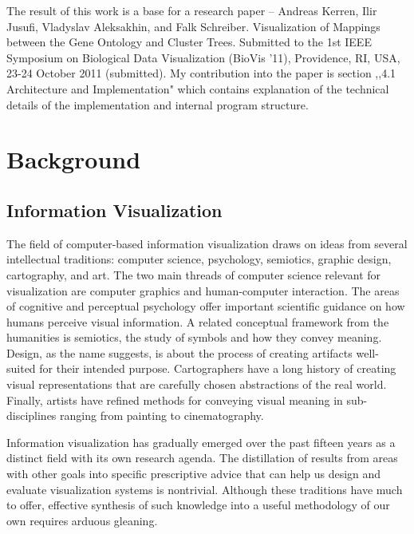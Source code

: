 The result of this work is a base for a research paper -- \textsf{Andreas Kerren, Ilir Jusufi, Vladyslav Aleksakhin, and Falk Schreiber. Visualization of Mappings between the Gene Ontology and Cluster Trees. Submitted to the 1st IEEE Symposium on Biological Data Visualization (BioVis '11), Providence, RI, USA, 23-24 October 2011 (submitted).} My contribution into the paper is section ,,4.1 Architecture and Implementation" which contains explanation of the technical details of the implementation and internal program structure.

\section{Background}
\label{sec:background}


\subsection{Information Visualization}
\label{sec:infovis}

The field of computer-based information visualization draws on ideas from several intellectual traditions: computer science, psychology, semiotics, graphic design, cartography, and art. The two main threads of computer science relevant for visualization are computer graphics and human-computer interaction. The areas of cognitive and perceptual psychology offer important scientific guidance on how humans perceive visual information. A related conceptual framework from the humanities is semiotics, the study of symbols and how they convey meaning. Design, as the name suggests, is about the process of creating artifacts well- suited for their intended purpose. Cartographers have a long history of creating visual representations that are carefully chosen abstractions of the real world. Finally, artists have refined methods for conveying visual meaning in sub-disciplines ranging from painting to cinematography.

Information visualization has gradually emerged over the past fifteen years as a distinct field with its own research agenda. The distillation of results from areas with other goals into specific prescriptive advice that can help us design and evaluate visualization systems is nontrivial. Although these traditions have much to offer, effective synthesis of such knowledge into a useful methodology of our own requires arduous gleaning.

